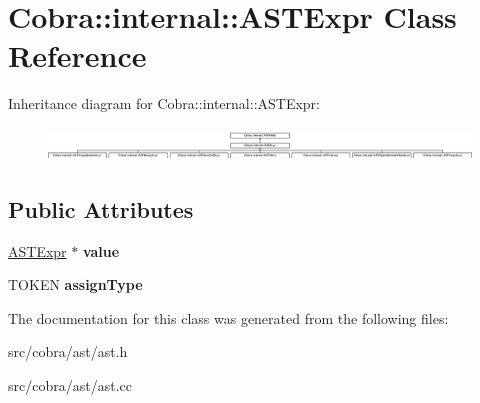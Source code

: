 \hypertarget{class_cobra_1_1internal_1_1_a_s_t_expr}{\section{Cobra\+:\+:internal\+:\+:A\+S\+T\+Expr Class Reference}
\label{class_cobra_1_1internal_1_1_a_s_t_expr}
}
Inheritance diagram for Cobra\+:\+:internal\+:\+:A\+S\+T\+Expr\+:\begin{figure}[H]
\begin{center}
\leavevmode
\includegraphics[height=0.872727cm]{class_cobra_1_1internal_1_1_a_s_t_expr}
\end{center}
\end{figure}
\subsection*{Public Attributes}
\begin{DoxyCompactItemize}
\item 
\hypertarget{class_cobra_1_1internal_1_1_a_s_t_expr_af1bf2806f323bc63de0a3aab9f181923}{\hyperlink{class_cobra_1_1internal_1_1_a_s_t_expr}{A\+S\+T\+Expr} $\ast$ {\bfseries value}}\label{class_cobra_1_1internal_1_1_a_s_t_expr_af1bf2806f323bc63de0a3aab9f181923}

\item 
\hypertarget{class_cobra_1_1internal_1_1_a_s_t_expr_a88bfbf832e3b00a89ba949562f573919}{T\+O\+K\+E\+N {\bfseries assign\+Type}}\label{class_cobra_1_1internal_1_1_a_s_t_expr_a88bfbf832e3b00a89ba949562f573919}

\end{DoxyCompactItemize}


The documentation for this class was generated from the following files\+:\begin{DoxyCompactItemize}
\item 
src/cobra/ast/ast.\+h\item 
src/cobra/ast/ast.\+cc\end{DoxyCompactItemize}
